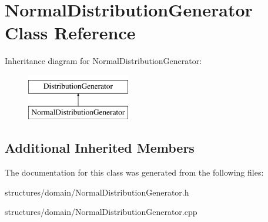 \hypertarget{class_normal_distribution_generator}{}\section{Normal\+Distribution\+Generator Class Reference}
\label{class_normal_distribution_generator}
Inheritance diagram for Normal\+Distribution\+Generator\+:\begin{figure}[H]
\begin{center}
\leavevmode
\includegraphics[height=2.000000cm]{df/d2c/class_normal_distribution_generator}
\end{center}
\end{figure}
\subsection*{Additional Inherited Members}


The documentation for this class was generated from the following files\+:\begin{DoxyCompactItemize}
\item 
structures/domain/Normal\+Distribution\+Generator.\+h\item 
structures/domain/Normal\+Distribution\+Generator.\+cpp\end{DoxyCompactItemize}
